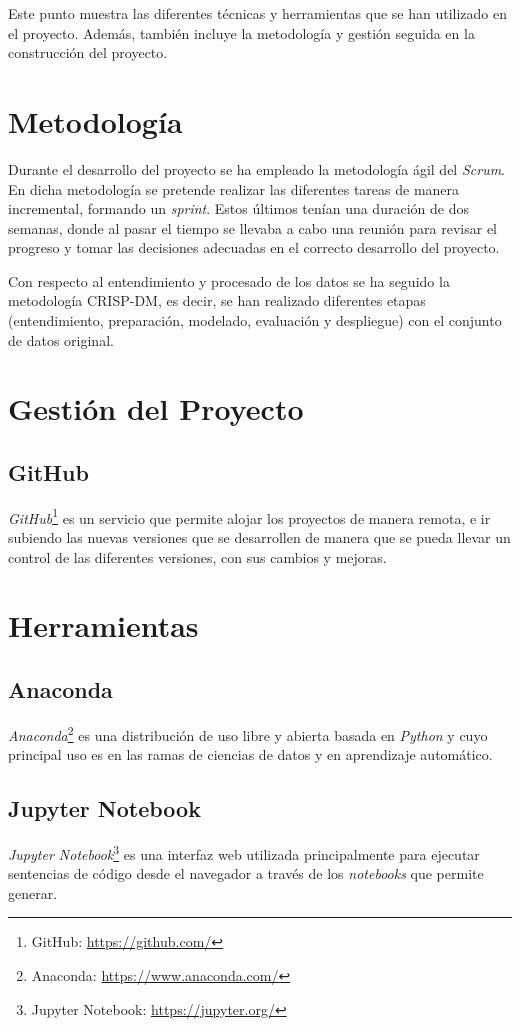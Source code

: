 
Este punto muestra las diferentes técnicas  y herramientas que se han utilizado en el proyecto. Además, también incluye la metodología y gestión seguida en la construcción del proyecto.

\section{Metodología}
Durante el desarrollo del proyecto se ha empleado la metodología ágil del \emph{Scrum}. En dicha metodología se pretende realizar las diferentes tareas de manera incremental, formando un \emph{sprint}. Estos últimos tenían una duración de dos semanas, donde al pasar el tiempo se llevaba a cabo una reunión para revisar el progreso y tomar las decisiones adecuadas en el correcto desarrollo del proyecto.

Con respecto al entendimiento y procesado de los datos se ha seguido la metodología CRISP-DM, es decir, se han realizado diferentes etapas (entendimiento, preparación, modelado, evaluación y despliegue) con el conjunto de datos original.

\section{Gestión del Proyecto}
\subsection{GitHub}
\emph{GitHub}\footnote{GitHub: \url{https://github.com/}} es un servicio que permite alojar los proyectos de manera remota, e ir subiendo las nuevas versiones que se desarrollen de manera que se pueda llevar un control de las diferentes versiones, con sus cambios y mejoras.

\section{Herramientas}
\subsection{Anaconda}
\emph{Anaconda}\footnote{Anaconda: \url{https://www.anaconda.com/}} es una distribución de uso libre y abierta basada en \emph{Python} y cuyo principal uso es en las ramas de ciencias de datos y en aprendizaje automático.

\subsection{Jupyter Notebook}
\emph{Jupyter Notebook}\footnote{Jupyter Notebook: \url{https://jupyter.org/}} es una interfaz web utilizada principalmente para ejecutar sentencias de código desde el navegador a través de los \emph{notebooks} que permite generar.

